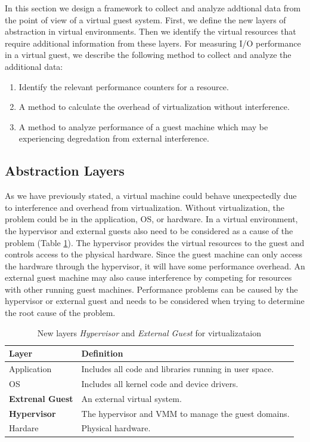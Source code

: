 In this section we design a framework to collect and analyze addtional data from the point of view of a virtual guest system. 
First, we define the new layers of abstraction in virtual environments.  
Then we identify the virtual resources that require additional information from these layers.
For measuring I/O performance in a virtual guest, we describe the following method to collect and analyze the additional data:
\begin {enumerate}
  \item Identify the relevant performance counters for a resource.
  \item A method to calculate the overhead of virtualization without interference.
  \item A method to analyze performance of a guest machine which may be experiencing degredation from external interference.
\end{enumerate}

\subsection{Abstraction Layers}
As we have previously stated, a virtual machine could behave unexpectedly due to interference and overhead from virtualization.
Without virtualization, the problem could be in the application, OS, or hardware.  
In a virtual environment, the hypervisor and external guests also need to be considered as a cause of the problem (Table \ref{tab:layers}).  
The hypervisor provides the virtual resources to the guest and controls access to the physical hardware.  
Since the guest machine can only access the hardware through the hypervisor, it will have some performance overhead. 
An external guest machine may also cause interference by competing for resources with other running guest machines.  
Performance problems can be caused by the hypervisor or external guest and needs to be considered when trying to determine the root cause of the problem.

\begin{table}[h]
\begin{tabular}{ l p{10cm} }
  Layer & Definition \\
  \hline
  Application & Includes all code and libraries running in user space. \\
  OS & Includes all kernel code and device drivers. \\
  \textbf{Extrenal Guest} & An external virtual system. \\
  \textbf{Hypervisor} & The hypervisor and VMM to manage the guest domains. \\
  Hardare & Physical hardware. \\
  \hline
\end{tabular}
\caption{New layers \emph{Hypervisor} and \emph{External Guest} for virtualizataion}
\label{tab:layers}
\end{table}

